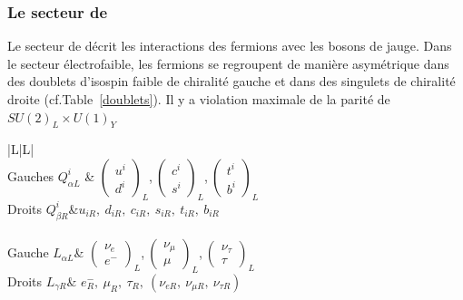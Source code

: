 \subsubsection{Le secteur de }
Le secteur de  décrit les interactions des fermions avec les bosons de jauge. Dans le secteur électrofaible, les fermions se regroupent de manière asymétrique dans des doublets d'isospin faible de chiralité gauche et dans des singulets de chiralité droite (cf.Table~\ref{doublets}). Il y a violation maximale de la parité de $SU(2)_{L}\times U(1)_{Y}$

\begin{table}[H]
	\centering
	\begin{tabular}{|L|L|} 
	\hline
	 \\
	\hline
	Gauches $Q_{\alpha L}^{i}$ & $
	\left(\begin{matrix} 
	 u^{i}\\
	 d^{i} 
	\end{matrix}\right)_{L}$,$\ 
	\left(\begin{matrix} 
	 c^{i}\\
	 s^{i}
	\end{matrix}\right)_{L}$,$\ 
	\left(\begin{matrix} 
	 t^{i}\\
	 b^{i}
	\end{matrix}\right)_{L}$ \\
	\hline
	Droits $Q_{\beta R}^{i}$&$ u_{iR},\ d_{iR},\ c_{iR},\ s_{iR},\ t_{iR},\ b_{iR}$\\
	\hline
	\rowcolor{Green2}\multicolumn{2}{|Cc|}{Leptons} \\
	\hline
	Gauche $L_{\alpha L}$& $
	\left(\begin{matrix} 
	\nu_{e}\\
	 e^{-}
	\end{matrix}\right)_{L}$,$\ 
	\left(\begin{matrix} 
	\nu_{\mu}\\
	\mu
	\end{matrix}\right)_{L}$,$\ 
	\left(\begin{matrix} 
	\nu_{\tau}\\
	\tau
	\end{matrix}\right)_{L} $\\
	\hline
	Droits $L_{\gamma R}$& $e^{-}_{R},\ \mu_{R},\ \tau_{R},\ \left(\nu_{e R},\ \nu_{\mu R},\ \nu_{\tau R}\right)$ \\
	\hline
\end{tabular}
\label{doublets}
\end{table}	

